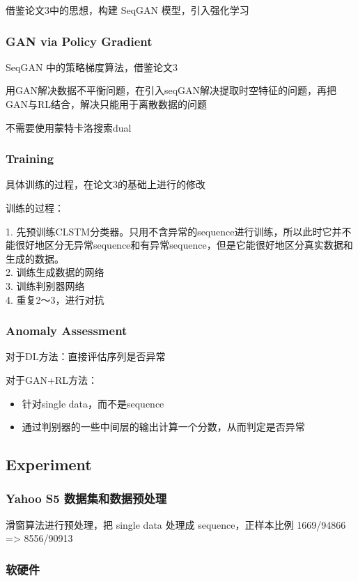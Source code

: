 \documentclass[12pt]{article}
\begin{document}
借鉴论文3中的思想，构建 SeqGAN 模型，引入强化学习

\subsubsection{GAN via Policy Gradient}
SeqGAN 中的策略梯度算法，借鉴论文3

用GAN解决数据不平衡问题，在引入seqGAN解决提取时空特征的问题，再把GAN与RL结合，解决只能用于离散数据的问题

不需要使用蒙特卡洛搜索dual


\subsubsection{Training}
具体训练的过程，在论文3的基础上进行的修改

训练的过程：

1. 先预训练CLSTM分类器。只用不含异常的sequence进行训练，所以此时它并不能很好地区分无异常sequence和有异常sequence，但是它能很好地区分真实数据和生成的数据。 \\
2. 训练生成数据的网络 \\
3. 训练判别器网络 \\
4. 重复2～3，进行对抗


\subsubsection{Anomaly Assessment}
对于DL方法：直接评估序列是否异常

对于GAN+RL方法：

\begin{itemize}
\item 针对single data，而不是sequence
\item 通过判别器的一些中间层的输出计算一个分数，从而判定是否异常
\end{itemize}

\subsection{\textbf{Experiment}}
\subsubsection{Yahoo S5 数据集和数据预处理}

滑窗算法进行预处理，把 single data 处理成 sequence，正样本比例 1669/94866 => 8556/90913 

\subsubsection{软硬件}
\end{document}

